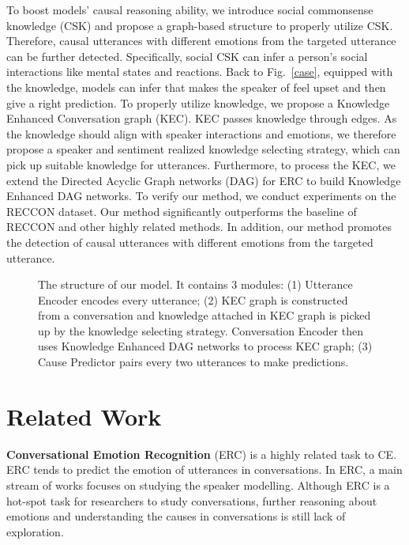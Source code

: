 \documentclass{article}
\begin{document}
To boost models' causal reasoning ability, we introduce social commonsense knowledge (CSK) \cite{ATOMIC2020} and propose a graph-based structure to properly utilize CSK. Therefore, causal utterances with different emotions from the targeted utterance can be further detected. Specifically, social CSK can infer a person's social interactions like mental states and reactions. Back to Fig.~\ref{case}, equipped with the knowledge, models can infer that  makes the speaker of  feel upset and then give a right prediction. To properly utilize knowledge, we propose a Knowledge Enhanced Conversation graph (KEC). KEC passes knowledge through edges. As the knowledge should align with speaker interactions and emotions, we therefore propose a speaker and sentiment realized knowledge selecting strategy, which can pick up suitable knowledge for utterances. Furthermore, to process the KEC, we extend the Directed Acyclic Graph networks (DAG) for ERC \cite{DAG} to build Knowledge Enhanced DAG networks. To verify our method, we conduct experiments on the RECCON dataset. Our method significantly outperforms the baseline of RECCON and other highly related methods. In addition, our method promotes the detection of causal utterances with different emotions from the targeted utterance. 



\begin{figure*}
    \centering
    \caption{The structure of our model. It contains 3 modules: (1) Utterance Encoder encodes every utterance; (2) KEC graph is constructed from a conversation and knowledge attached in KEC graph is picked up by the knowledge selecting strategy. Conversation Encoder then uses Knowledge Enhanced DAG networks to process KEC graph; (3) Cause Predictor pairs every two utterances to make predictions. }
    \vspace{-0.2cm}
    \label{model}
\end{figure*}

\section{Related Work}

\textbf{Conversational Emotion Recognition} (ERC) is a highly related task to CE. ERC tends to predict the emotion of utterances in conversations. In ERC, a main stream of works \cite{DialogueRNN,DialogueGCN,DialogXL} focuses on studying the speaker modelling. Although ERC is a hot-spot task for researchers to study conversations, further reasoning about emotions and understanding the causes in conversations is still lack of exploration. 
\end{document}

